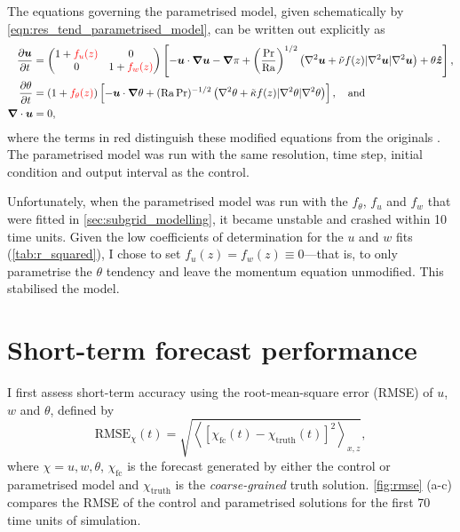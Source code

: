 \documentclass[../main.tex]{subfiles}
\begin{document}
The equations governing the parametrised model, given schematically by
\cref{eqn:res_tend_parametrised_model}, can be written out explicitly as
\begin{align*}
    \frac{\partial \bm{u}}{\partial t} &=
        \begin{pmatrix}
            1 + {\color{red} f_u(z)} & 0 \\
            0 & 1 + {\color{red} f_w(z)}
        \end{pmatrix}
        \left[
            -\bm{u} \cdot \bm{\nabla} \bm{u}
            -\bm{\nabla} \pi
            + \left( \frac{\mathrm{Pr}}{\mathrm{Ra}}\right)^{1/2}
            \left(
                \nabla^2 \bm{u}
                + \tilde{\nu} f(z) |\nabla^2 \bm{u}| \nabla^2 \bm{u}
            \right)
            + \theta \bm{\hat{z}}
        \right], \\
    \frac{\partial \theta}{\partial t} &=
        (1 + {\color{red} f_\theta(z)}) \left[
            -\bm{u} \cdot \bm{\nabla} \theta
            + (\mathrm{Ra}\,\mathrm{Pr})^{-1/2}
            \left(
                \nabla^2 \theta
                + \tilde{\kappa} f(z) |\nabla^2 \theta| \nabla^2 \theta
            \right)
        \right], \quad \text{and} \\
    \bm{\nabla} \cdot \bm{u} &= 0,
\end{align*}
where the terms in red distinguish these modified equations from the originals
. The
parametrised model was run with the same resolution, time step, initial
condition and output interval as the control.

Unfortunately, when the parametrised model was run with the $f_\theta$,
$f_u$ and $f_w$ that were fitted in \cref{sec:subgrid_modelling}, it
became unstable and crashed within 10 time units. Given the low coefficients
of determination for the $u$ and $w$ fits (\cref{tab:r_squared}), I
chose to set $f_u(z) = f_w(z) \equiv 0$---that is, to only parametrise the
$\theta$ tendency and leave the momentum equation unmodified. This stabilised
the model.

\newpage
\section{Short-term forecast performance} \label{sec:forecast}

I first assess short-term accuracy using the root-mean-square error (RMSE)
of $u$, $w$ and $\theta$, defined by
\[
    \mathrm{RMSE}_\chi(t) = \sqrt{\left\langle
        [\chi_\mathrm{fc}(t) - \chi_\mathrm{truth}(t)]^2
    \right\rangle _{x,z}},
\]
where $\chi = u, w, \theta$, $\chi_\mathrm{fc}$ is the forecast generated by
either the control or parametrised model and $\chi_\mathrm{truth}$ is the
\emph{coarse-grained} truth solution. \cref{fig:rmse} (a-c) compares the RMSE
of the control and parametrised solutions for the first 70 time units of
simulation.
\end{document}
